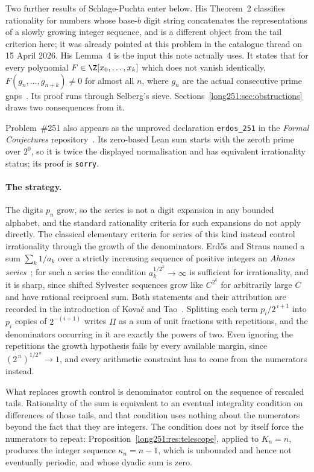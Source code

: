 \documentclass[11pt]{article}
\begin{document}
Two further results of Schlage-Puchta enter below.  His Theorem~2 classifies
rationality for numbers whose base-$b$ digit string concatenates the
representations of a slowly growing integer sequence, and is a different
object from the tail criterion here; it was already pointed at this problem in
the catalogue thread on 15 April 2026.  His Lemma~4 is the input this note
actually uses.  It states that for every polynomial $F\in\Z[x_0,\ldots,x_k]$
which does not vanish identically, $F(g_n,\ldots,g_{n+k})\ne0$ for almost all
$n$, where $g_n$ are the actual consecutive prime
gaps~\cite[Lemma~4, pp.~5--6]{schlagepuchta2011}.  Its proof runs through
Selberg's sieve.  Sections~\ref{long251:sec:obstructions} draws two consequences from
it.

Problem~\#251 also appears as the unproved declaration \texttt{erdos\_251} in
the \emph{Formal Conjectures} repository~\cite{formalconjectures251}.  Its
zero-based Lean sum starts with the zeroth prime over $2^0$, so it is twice the
displayed normalisation and has equivalent irrationality status; its proof is
\texttt{sorry}.

\paragraph{The strategy.}
The digits $p_n$ grow, so the series is not a digit expansion in any bounded
alphabet, and the standard rationality criteria for such expansions do not
apply directly.  The classical elementary criteria for series of this kind
instead control irrationality through the growth of the denominators.
Erd\H{o}s and Straus named a sum $\sum_k 1/a_k$ over a strictly increasing
sequence of positive integers an \emph{Ahmes series}~\cite{erdosstraus1963};
for such a series the condition $a_k^{1/2^k}\to\infty$ is sufficient for
irrationality, and it is sharp, since shifted Sylvester sequences grow like
$C^{2^{k}}$ for arbitrarily large $C$ and have rational reciprocal sum.  Both
statements and their attribution are recorded in the introduction of Kova\v{c}
and Tao~\cite[\S1]{kovactao2024}.  Splitting each term $p_i/2^{\,i+1}$ into
$p_i$ copies of $2^{-(i+1)}$ writes $\Pi$ as a sum of unit fractions with
repetitions, and the denominators occurring in it are exactly the powers of
two.  Even ignoring the repetitions the growth hypothesis fails by every
available margin, since $(2^{\,n})^{1/2^{\,n}}\to1$, and every arithmetic
constraint has to come from the numerators instead.

What replaces growth control is denominator control on the sequence of
rescaled tails.  Rationality of the sum is equivalent to an eventual
integrality condition on differences of those tails, and that condition uses
nothing about the numerators beyond the fact that they are integers.  The
condition does not by itself force the numerators to repeat:
Proposition~\ref{long251:res:telescope}, applied to $K_n=n$, produces the integer
sequence $\kappa_n=n-1$, which is unbounded and hence not eventually periodic,
and whose dyadic sum is zero.
\end{document}
